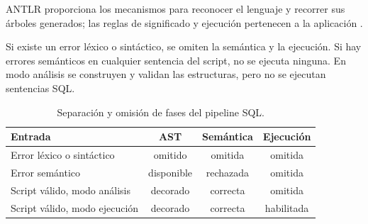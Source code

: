 \documentclass[11pt,a4paper]{article}
\begin{document}
\begin{center}
\end{center}

ANTLR proporciona los mecanismos para reconocer el lenguaje y recorrer
sus árboles generados; las reglas de significado y ejecución pertenecen
a la aplicación \cite{antlr,antlr-cpp}.

Si existe un error léxico o sintáctico, se omiten la semántica y la
ejecución. Si hay errores semánticos en cualquier sentencia del script,
no se ejecuta ninguna. En modo análisis se construyen y validan las
estructuras, pero no se ejecutan sentencias SQL.

\begin{table}[H]\centering\small
\begin{tabularx}{\textwidth}{@{}Yccc@{}}
\toprule
\textbf{Entrada} & \textbf{AST} & \textbf{Semántica} & \textbf{Ejecución}\\
\midrule
Error léxico o sintáctico & omitido & omitida & omitida\\
Error semántico & disponible & rechazada & omitida\\
Script válido, modo análisis & decorado & correcta & omitida\\
Script válido, modo ejecución & decorado & correcta & habilitada\\
\bottomrule
\end{tabularx}
\caption{Separación y omisión de fases del pipeline SQL.}
\end{table}
\end{document}

